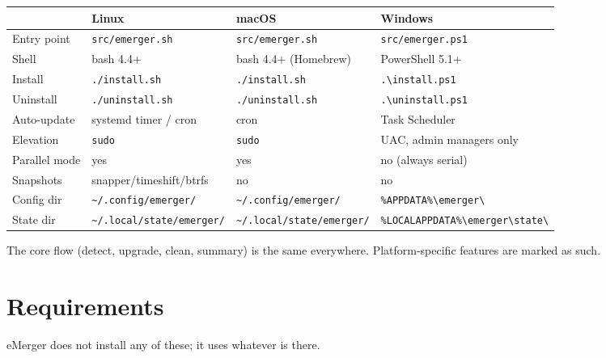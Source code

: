 \documentclass[11pt,a4paper]{article}
\begin{document}
\begin{center}
\footnotesize
\begin{tabular}{@{}llll@{}}
\toprule
                  & \textbf{Linux}            & \textbf{macOS}               & \textbf{Windows}        \\
\midrule
Entry point       & \texttt{src/emerger.sh}   & \texttt{src/emerger.sh}      & \texttt{src/emerger.ps1}\\
Shell             & bash 4.4+                 & bash 4.4+ (Homebrew)         & PowerShell 5.1+         \\
Install           & \texttt{./install.sh}       & \texttt{./install.sh}          & \texttt{.\textbackslash install.ps1}   \\
Uninstall         & \texttt{./uninstall.sh}   & \texttt{./uninstall.sh}      & \texttt{.\textbackslash uninstall.ps1}\\
Auto-update       & systemd timer / cron      & cron                         & Task Scheduler          \\
Elevation         & \texttt{sudo}             & \texttt{sudo}                & UAC, admin managers only \\
Parallel mode     & yes                       & yes                          & no (always serial)      \\
Snapshots         & snapper/timeshift/btrfs   & no                           & no                      \\
Config dir        & \verb|~/.config/emerger/| & \verb|~/.config/emerger/|    & \verb|%APPDATA%\emerger\|\\
State dir         & \verb|~/.local/state/emerger/| & \verb|~/.local/state/emerger/| & \verb|%LOCALAPPDATA%\emerger\state\|\\
\bottomrule
\end{tabular}
\end{center}

The core flow (detect, upgrade, clean, summary) is the same everywhere.
Platform-specific features are marked as such.

\section{Requirements}\label{sec:requirements}

eMerger does not install any of these; it uses whatever is there.
\end{document}
